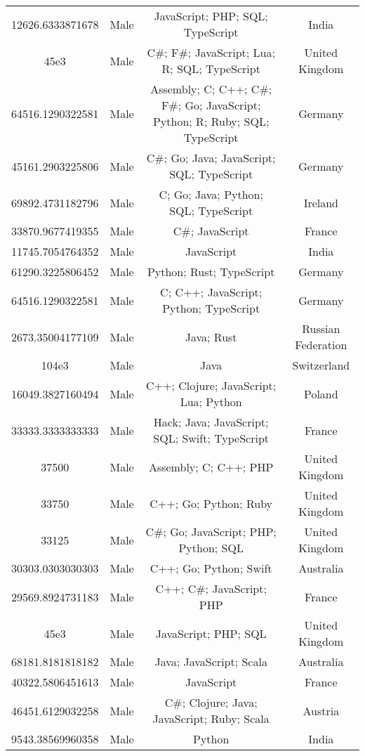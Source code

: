 \begin{center}
\begin{tabular}{ |c|c|c|c| }
12626.6333871678  &  Male  &  JavaScript; PHP; SQL; TypeScript  &  India  \\ 
45e3  &  Male  &  C\#; F\#; JavaScript; Lua; R; SQL; TypeScript  &  United Kingdom  \\ 
64516.1290322581  &  Male  &  Assembly; C; C++; C\#; F\#; Go; JavaScript; Python; R; Ruby; SQL; TypeScript  &  Germany  \\ 
45161.2903225806  &  Male  &  C\#; Go; Java; JavaScript; SQL; TypeScript  &  Germany  \\ 
69892.4731182796  &  Male  &  C; Go; Java; Python; SQL; TypeScript  &  Ireland  \\ 
33870.9677419355  &  Male  &  C\#; JavaScript  &  France  \\ 
11745.7054764352  &  Male  &  JavaScript  &  India  \\ 
61290.3225806452  &  Male  &  Python; Rust; TypeScript  &  Germany  \\ 
64516.1290322581  &  Male  &  C; C++; JavaScript; Python; TypeScript  &  Germany  \\ 
2673.35004177109  &  Male  &  Java; Rust  &  Russian Federation  \\ 
104e3  &  Male  &  Java  &  Switzerland  \\ 
16049.3827160494  &  Male  &  C++; Clojure; JavaScript; Lua; Python  &  Poland  \\ 
33333.3333333333  &  Male  &  Hack; Java; JavaScript; SQL; Swift; TypeScript  &  France  \\ 
37500  &  Male  &  Assembly; C; C++; PHP  &  United Kingdom  \\ 
33750  &  Male  &  C++; Go; Python; Ruby  &  United Kingdom  \\ 
33125  &  Male  &  C\#; Go; JavaScript; PHP; Python; SQL  &  United Kingdom  \\ 
30303.0303030303  &  Male  &  C++; Go; Python; Swift  &  Australia  \\ 
29569.8924731183  &  Male  &  C++; C\#; JavaScript; PHP  &  France  \\ 
45e3  &  Male  &  JavaScript; PHP; SQL  &  United Kingdom  \\ 
68181.8181818182  &  Male  &  Java; JavaScript; Scala  &  Australia  \\ 
40322.5806451613  &  Male  &  JavaScript  &  France  \\ 
46451.6129032258  &  Male  &  C\#; Clojure; Java; JavaScript; Ruby; Scala  &  Austria  \\ 
9543.38569960358  &  Male  &  Python  &  India  \\ 

\end{tabular}
\end{center}
